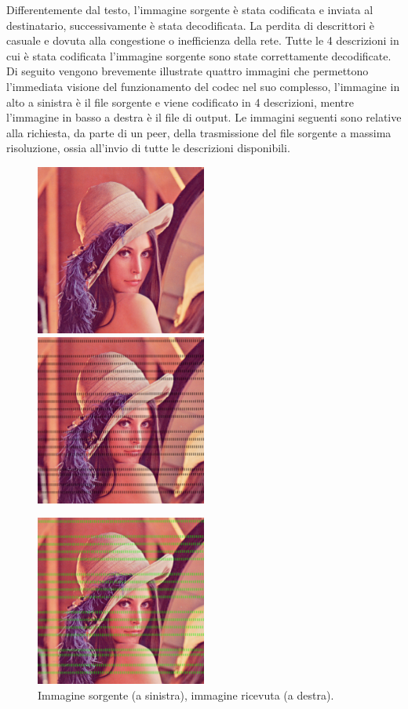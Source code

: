 Differentemente dal testo, l'immagine sorgente è stata codificata e
inviata al destinatario, successivamente è stata decodificata. La perdita di descrittori è casuale e dovuta alla congestione o inefficienza della rete. Tutte le 4 descrizioni in cui è stata codificata
l'immagine sorgente sono state correttamente decodificate. Di seguito vengono
brevemente illustrate quattro immagini che permettono l'immediata visione del funzionamento del codec nel suo complesso, l'immagine in alto a sinistra è il file sorgente e viene
codificato in 4 descrizioni, mentre l'immagine in basso a destra è il file di
output. Le immagini seguenti sono relative alla richiesta, da parte di un peer,
della trasmissione del file sorgente a massima risoluzione, ossia all'invio di
tutte le descrizioni disponibili.

\begin{figure}[ht]
\includegraphics[width=0.50\textwidth]{../images/lena1.png}
\includegraphics[width=0.50\textwidth]{../images/lena2.png}
	\caption{Immagine sorgente (a sinistra), immagine ricevuta (a destra).}
\includegraphics[width=0.50\textwidth]{../images/lena3.png}

\end{figure}
